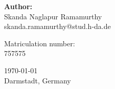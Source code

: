 \begin{titlepage}
\begin{center}
\begin{minipage}{0.4\textwidth}
\begin{flushleft}
\textbf{Author:}\\[0.1cm]
Skanda Naglapur Ramamurthy\\
skanda.ramamurthy@stud.h-da.de\\[0.2cm]
\end{flushleft}
\end{minipage}
\begin{minipage}{0.4\textwidth}
\begin{flushright} 
Matriculation number: \\
757575 \\
\end{flushright}
\end{minipage}
\end{center}
\vspace{1cm}

{\raggedleft \today}\\
{\raggedleft Darmstadt, Germany}

\end{titlepage}

